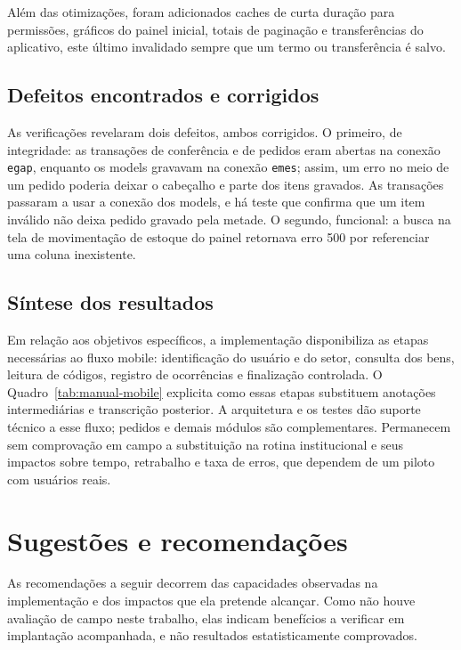 \documentclass[12pt,a4paper]{article}
\begin{document}
Além das otimizações, foram adicionados caches de curta duração para permissões, gráficos do painel inicial, totais de paginação e transferências do aplicativo, este último invalidado sempre que um termo ou transferência é salvo.

\subsection{Defeitos encontrados e corrigidos}

As verificações revelaram dois defeitos, ambos corrigidos. O primeiro, de integridade: as transações de conferência e de pedidos eram abertas na conexão \texttt{egap}, enquanto os models gravavam na conexão \texttt{emes}; assim, um erro no meio de um pedido poderia deixar o cabeçalho e parte dos itens gravados. As transações passaram a usar a conexão dos models, e há teste que confirma que um item inválido não deixa pedido gravado pela metade. O segundo, funcional: a busca na tela de movimentação de estoque do painel retornava erro 500 por referenciar uma coluna inexistente.

\subsection{Síntese dos resultados}

Em relação aos objetivos específicos, a implementação disponibiliza as etapas necessárias ao fluxo mobile: identificação do usuário e do setor, consulta dos bens, leitura de códigos, registro de ocorrências e finalização controlada. O Quadro~\ref{tab:manual-mobile} explicita como essas etapas substituem anotações intermediárias e transcrição posterior. A arquitetura e os testes dão suporte técnico a esse fluxo; pedidos e demais módulos são complementares. Permanecem sem comprovação em campo a substituição na rotina institucional e seus impactos sobre tempo, retrabalho e taxa de erros, que dependem de um piloto com usuários reais.

\section{Sugestões e recomendações}

As recomendações a seguir decorrem das capacidades observadas na implementação e dos impactos que ela pretende alcançar. Como não houve avaliação de campo neste trabalho, elas indicam benefícios a verificar em implantação acompanhada, e não resultados estatisticamente comprovados.
\end{document}
